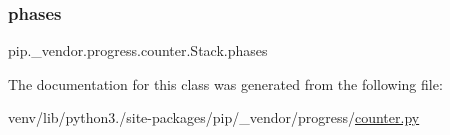 \subsubsection{\texorpdfstring{phases}{phases}}
{\footnotesize\ttfamily pip.\+\_\+vendor.\+progress.\+counter.\+Stack.\+phases\hspace{0.3cm}{\ttfamily [static]}}



The documentation for this class was generated from the following file\+:\begin{DoxyCompactItemize}
\item 
venv/lib/python3./site-\/packages/pip/\+\_\+vendor/progress/\hyperlink{counter_8py}{counter.\+py}\end{DoxyCompactItemize}
